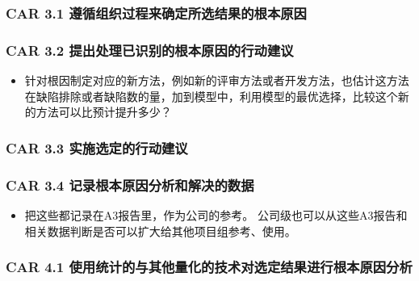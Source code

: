 \hypertarget{car-3.1-ux9075ux5faaux7ec4ux7ec7ux8fc7ux7a0bux6765ux786eux5b9aux6240ux9009ux7ed3ux679cux7684ux6839ux672cux539fux56e0}{%
\subsubsection{CAR 3.1
遵循组织过程来确定所选结果的根本原因}\label{car-3.1-ux9075ux5faaux7ec4ux7ec7ux8fc7ux7a0bux6765ux786eux5b9aux6240ux9009ux7ed3ux679cux7684ux6839ux672cux539fux56e0}}

\hypertarget{car-3.2-ux63d0ux51faux5904ux7406ux5df2ux8bc6ux522bux7684ux6839ux672cux539fux56e0ux7684ux884cux52a8ux5efaux8bae}{%
\subsubsection{CAR 3.2
提出处理已识别的根本原因的行动建议}\label{car-3.2-ux63d0ux51faux5904ux7406ux5df2ux8bc6ux522bux7684ux6839ux672cux539fux56e0ux7684ux884cux52a8ux5efaux8bae}}

\begin{itemize}
\tightlist
\item
  针对根因制定对应的新方法，例如新的评审方法或者开发方法，也估计这方法在缺陷排除或者缺陷数的量，加到模型中，利用模型的最优选择，比较这个新的方法可以比预计提升多少？
\end{itemize}

\hypertarget{car-3.3-ux5b9eux65bdux9009ux5b9aux7684ux884cux52a8ux5efaux8bae}{%
\subsubsection{CAR 3.3
实施选定的行动建议}\label{car-3.3-ux5b9eux65bdux9009ux5b9aux7684ux884cux52a8ux5efaux8bae}}

\hypertarget{car-3.4-ux8bb0ux5f55ux6839ux672cux539fux56e0ux5206ux6790ux548cux89e3ux51b3ux7684ux6570ux636e}{%
\subsubsection{CAR 3.4
记录根本原因分析和解决的数据}\label{car-3.4-ux8bb0ux5f55ux6839ux672cux539fux56e0ux5206ux6790ux548cux89e3ux51b3ux7684ux6570ux636e}}

\begin{itemize}
\tightlist
\item
  把这些都记录在A3报告里，作为公司的参考。
  公司级也可以从这些A3报告和相关数据判断是否可以扩大给其他项目组参考、使用。
\end{itemize}

\hypertarget{car-4.1-ux4f7fux7528ux7edfux8ba1ux7684ux4e0eux5176ux4ed6ux91cfux5316ux7684ux6280ux672fux5bf9ux9009ux5b9aux7ed3ux679cux8fdbux884cux6839ux672cux539fux56e0ux5206ux6790}{%
\subsubsection{CAR 4.1
使用统计的与其他量化的技术对选定结果进行根本原因分析}\label{car-4.1-ux4f7fux7528ux7edfux8ba1ux7684ux4e0eux5176ux4ed6ux91cfux5316ux7684ux6280ux672fux5bf9ux9009ux5b9aux7ed3ux679cux8fdbux884cux6839ux672cux539fux56e0ux5206ux6790}}

